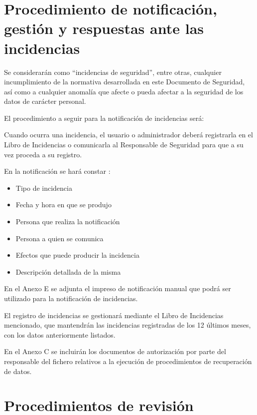 \documentclass[a4paper,11pt,bibtotoc,noliststotoc]{scrbook}
\begin{document}
\chapter{Procedimiento de notificación, gestión y respuestas ante las incidencias}

Se considerarán como "`incidencias de seguridad"', entre otras, cualquier incumplimiento de la normativa desarrollada en este Documento de Seguridad, así como a cualquier anomalía que afecte o pueda afectar a la seguridad de los datos de carácter personal.

El procedimiento a seguir para la notificación de incidencias será:

Cuando ocurra una incidencia, el usuario o administrador deberá registrarla en el Libro de Incidencias o comunicarla al Responsable de Seguridad para que a su vez proceda a su registro.

En la notificación se hará constar :
\begin{itemize}
\item Tipo de incidencia
\item Fecha y hora en que se produjo
\item Persona que realiza la notificación
\item Persona a quien se comunica
\item Efectos que puede producir la incidencia
\item Descripción detallada de la misma
\end{itemize}

En el Anexo E se adjunta el impreso de notificación manual que podrá ser utilizado para la notificación de incidencias.

El registro de incidencias se gestionará mediante el Libro de Incidencias mencionado, que mantendrán las incidencias registradas de los 12 últimos meses, con los datos anteriormente listados.

En el Anexo C se incluirán los documentos de autorización por parte del responsable del fichero relativos a la ejecución de procedimientos de recuperación de datos.





\chapter{Procedimientos de revisión}
\end{document}
